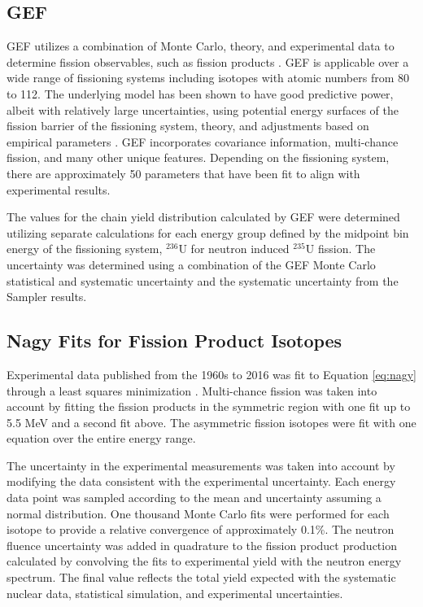 \subsection{GEF}

GEF utilizes a combination of Monte Carlo, theory, and experimental data to determine fission observables, such as fission products \cite{Schmidt2016}. 
GEF is applicable over a wide range of fissioning systems including isotopes with atomic numbers from 80 to 112\cite{Schmidt2015}. 
The underlying model has been shown to have good predictive power, albeit with relatively large uncertainties, using potential energy surfaces of the fission barrier of the fissioning system, theory, and adjustments based on empirical parameters \cite{Schmidt2014}. 
GEF incorporates covariance information, multi-chance fission, and many other unique features. 
Depending on the fissioning system, there are approximately 50 parameters that have been fit to align with experimental results.  

The values for the chain yield distribution calculated by GEF were determined utilizing separate calculations for each energy group defined by the midpoint bin energy of the fissioning system, $\mathrm{^{236}U}$ for neutron induced $\mathrm{^{235}U}$ fission. 
The uncertainty was determined using a combination of the GEF Monte Carlo statistical and systematic uncertainty and the systematic uncertainty from the Sampler results. 

\subsection{Nagy Fits for Fission Product Isotopes}

Experimental data published from the 1960s to 2016 was fit to Equation \ref{eq:nagy} through a least squares minimization  \cite{Nagy1978,Gindler1981,Ford1965,Gooden2016,Gooden2014,ENDF,Nethaway1973,ChapmanT1978,England1994,Cuninghame1974}. Multi-chance fission was taken into account by fitting the fission products in the symmetric region with one fit up to 5.5 MeV and a second fit above. The asymmetric fission isotopes were fit with one equation over the entire energy range. 

The uncertainty in the experimental measurements was taken into account by modifying the data consistent with the experimental uncertainty. 
Each energy data point was sampled according to the mean and uncertainty assuming a normal distribution. 
One thousand Monte Carlo fits were performed for each isotope to provide a relative convergence of approximately 0.1\%. 
The neutron fluence uncertainty was added in quadrature to the fission product production calculated by convolving the fits to experimental yield with the neutron energy spectrum.  
The final value reflects the total yield expected with the systematic nuclear data, statistical simulation, and experimental uncertainties. 

